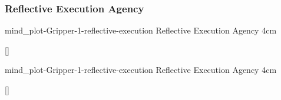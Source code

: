 {\newpage
  \noindent\begin{minipage}{\textwidth}
    \subsubsection{Reflective Execution Agency}
    \experimentcausegroupplots{\dataappendixmaxtime}
                           {\dataappendixexperimentonemaxtime}
                           {\dataappendixexperimenttwomaxtime}
                           {\dataappendixexperimentthreemaxtime}
                           {\dataappendixexperimentonename}
                           {\dataappendixexperimenttwoname}
                           {\dataappendixexperimentthreename}
                           {\dataappendixexperimentoneprettyname}
                           {\dataappendixexperimenttwoprettyname}
                           \experimentcausegroupplotscontinued{\dataappendixexperimentthreeprettyname}
                                                              {mind_plot-Gripper-1-reflective-execution}
                                                              {Reflective Execution Agency}
                                                              {\experimentdatacommontablereference}
                                                              {4cm}
    \experimentdatablocksworldexample

    []{}
  \label{figure:mind_plot-Gripper-1-reflective-execution}
  \end{minipage}

  \noindent\begin{minipage}{\textwidth}
    \experimentcausegroupplotstwo{\dataappendixmaxtime}
                           {\dataappendixexperimentonemaxtime}
                           {\dataappendixexperimenttwomaxtime}
                           {\dataappendixexperimentthreemaxtime}
                           {\dataappendixexperimentonename}
                           {\dataappendixexperimenttwoname}
                           {\dataappendixexperimentthreename}
                           {\dataappendixexperimentoneprettyname}
                           {\dataappendixexperimenttwoprettyname}
                           \experimentcausegroupplotstwocontinued{\dataappendixexperimentthreeprettyname}
                                                              {mind_plot-Gripper-1-reflective-execution}
                                                              {Reflective Execution Agency}
                                                              {\experimentdatacommontablereference}
                                                              {4cm}
    \experimentdatablocksworldexample

    []{}
  \label{figure:mind_plot-Gripper-1-reflective-execution}
  \end{minipage}
}
